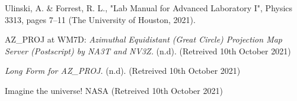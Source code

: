 \documentclass[twoside,10pt]{article}
\begin{document}
\begin{multicols}{2}
		
		
		\begin{thebibliography}{99} %
	
	Ulinski, A. \& Forrest, R. L., "Lab Manual for Advanced Laboratory I", Physics 3313, pages 7–11 (The University of Houston, 2021).
	
	AZ\_PROJ at WM7D: \textit{Azimuthal Equidistant (Great Circle) Projection Map Server (Postscript) by NA3T and NV3Z.} (n.d). (Retreived 10th October 2021) 
	
	\textit{Long Form for AZ\_PROJ.} (n.d). (Retreived 10th October 2021)
	
	Imagine the universe! NASA (Retreived 10th October 2021) 


	
\end{thebibliography}
		
		
	\end{multicols}
	
\end{document}
